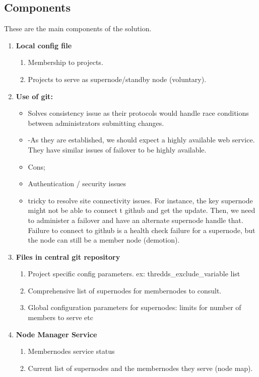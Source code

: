 \documentclass[oneside,12pt]{memoir}
\begin{document}
\subsection{Components}
\label{stow}

These are the main components of the solution.
\begin{enumerate}
\item
\textbf{Local config file} 
\begin{enumerate}
\item Membership to projects.
\item Projects to serve as supernode/standby node (voluntary).


\end{enumerate}

\item
\textbf{Use of git:  }

\begin{itemize}
\item
Solves consistency issue as their protocols would handle race conditions between administrators submitting changes. 
\item
-As they are established, we should expect a highly available web service.  They have similar issues of failover to be highly available.
\item
Cons;
\item
 Authentication / security issues
 \item
 tricky to resolve site connectivity issues.  For instance, the key supernode might not be able to connect t github and get the update.  Then, we need to administer a failover and have an alternate supernode handle that.  Failure to connect to github is a health check failure for a supernode, but the node can still be a member node (demotion).  
\end{itemize}



\item \textbf{Files in central git repository}
\begin{enumerate}
\item Project specific config parameters. ex: thredds\_exclude\_variable list
\item Comprehensive list of supernodes for membernodes to consult.
\item Global configuration parameters for supernodes: limits for number of members to serve etc
\end{enumerate}
\item \textbf{Node Manager Service}
\begin{enumerate}
\item Membernodes service status
\item Current list of supernodes and the membernodes they serve (node map).
\end{enumerate}


\end{enumerate}
\end{document}
